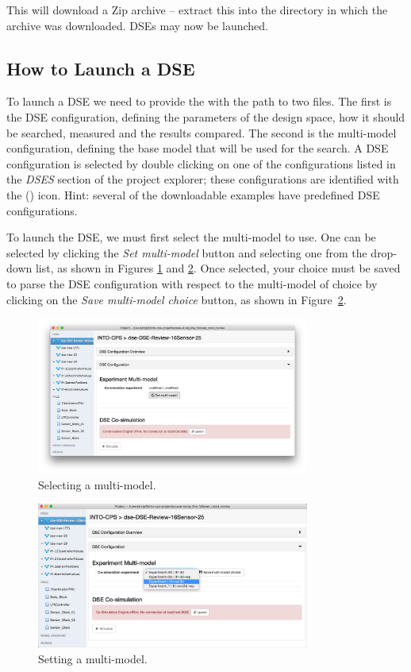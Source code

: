 This will download a Zip archive -- extract this into the directory in which the archive was downloaded. DSEs may now be launched.

\subsection{How to Launch a DSE}\label{sec:dse:launch}
To launch a DSE we need to provide the \intoapp{} with the path to two files.  The first is the DSE configuration, defining the parameters of the design space, how it should be searched, measured and the results compared.   The second is the multi-model configuration, defining the base model that will be used for the search.  A DSE configuration is selected by double clicking on one of the configurations listed in the \emph{DSES} section of the \intoapp{} project explorer; these configurations are identified with the (\DSEIcon) icon.  Hint: several of the downloadable examples have predefined  DSE configurations.

To launch the DSE, we must first select the multi-model to use. One can be selected by clicking the \emph{Set multi-model} button and selecting one from the drop-down list, as shown in Figures \ref{fig:dse:launch:selectmultimodel} and \ref{fig:dse:launch:setmultimodel}.  Once selected, your choice must be saved to parse the DSE configuration with respect to the multi-model of choice by clicking on the \emph{Save multi-model choice} button, as shown in Figure~\ref{fig:dse:launch:setmultimodel}.
%
%
%
\begin{figure}
	\centering
	\includegraphics[width=0.8\textwidth]{figures/dse/launch-selectmultimodel}
	\caption{Selecting a multi-model.}\label{fig:dse:launch:selectmultimodel}
\end{figure}

\begin{figure}
	\centering
	\includegraphics[width=0.8\textwidth]{figures/dse/launch-setmultimodel}
	\caption{Setting a multi-model.}\label{fig:dse:launch:setmultimodel}
\end{figure}


